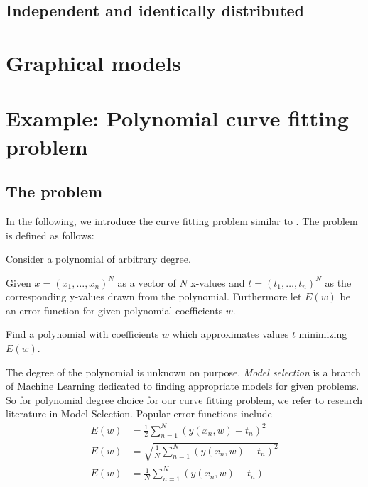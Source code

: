 \subsection{Independent and identically distributed}
\label{sec:bp-iid}
%

\section{Graphical models}
\label{sec:bp-graphical-models}
%

\section{Example: Polynomial curve fitting problem}
\label{sec:bp-curve-fitting}
%
\subsection{The problem}
%

In the following, we introduce the curve fitting problem similar to \cite[p.~4~ff.]{Bishop}.
The problem is defined as follows:

\begin{problem}
  Consider a polynomial of arbitrary degree.

  \begin{description}
  \item{Given}
  $x = (x_1, \ldots, x_n)^N$ as a vector of $N$ x-values and
  $t = (t_1, \ldots, t_n)^N$ as the corresponding y-values drawn from the polynomial.
  Furthermore let $E(w)$ be an error function for given polynomial coefficients $w$.

  \item{Find}
  a polynomial with coefficients $w$ which approximates values $t$ minimizing $E(w)$.
  \end{description}
\end{problem}

The degree of the polynomial is unknown on purpose.
\emph{Model selection} is a branch of Machine Learning dedicated to finding appropriate models for given problems.
So for polynomial degree choice for our curve fitting problem, we refer to research literature in Model Selection. 
Popular error functions include
\begin{align}
  E(w) &= \frac12 \sum_{n=1}^N \left(y(x_n, w) - t_n\right)^2 \tag{Mean squared error, MSE} \\
  E(w) &= \sqrt{\frac{1}{N} \sum_{n=1}^N (y(x_n, w) - t_n)^2} \tag{Root mean square, RMS} \\
  E(w) &= \frac1N \sum_{n=1}^N (y(x_n, w) - t_n)              \tag{Mean signed deviation, MSD}
\end{align}

